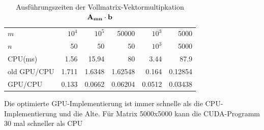 \begin{table}
\renewcommand{\arraystretch}{1.3}
\caption{Ausführungszeiten der Vollmatrix-Vektormultipkation $ \bf{A_{mn} } \cdot \bf b$}
\label{shared_memory}
\centering
\begin{tabular}{|l||r|r|r|r|r|}

\hline
	$m$& $10^4$ & $10^5$ & 50000& $10^3 $ & 5000\\
    $n$& 50& 50& 50& $10^3$ & 5000 \\

\hline
\hline
CPU(ms)& 1.56&    15.94& 				80&      3.44& 87.9\\

old GPU/CPU& 1.711& 1.6348&   1.62548&  0.164&  0.12854\\

GPU/CPU & 0.133& 0.0662&     0.06204&   0.0512& 0.03438\\


\hline
\end{tabular}
\end{table}
Die optimierte GPU-Implementierung ist immer schnelle als die CPU-Implementierung  und die Alte. Für Matrix 5000x5000 kann die CUDA-Programm 30 mal schneller als CPU

